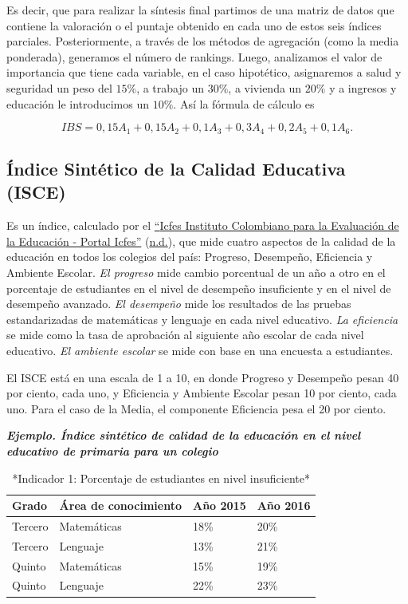 \documentclass[
  11pt,
]{book}
\begin{document}
Es decir, que para realizar la síntesis final partimos de una matriz de datos que contiene la valoración o el puntaje obtenido en cada uno de estos seis índices parciales. Posteriormente, a través de los métodos de agregación (como la media ponderada), generamos el número de rankings. Luego, analizamos el valor de importancia que tiene cada variable, en el caso hipotético, asignaremos a salud y seguridad un peso del \(15\%\), a trabajo un \(30\%\), a vivienda un \(20\%\) y a ingresos y educación le introducimos un \(10\%\). Así la fórmula de cálculo es

\[\begin{equation}
IBS=0,15A_1+0,15A_2+0,1A_3+0,3A_4+0,2A_5+0,1A_6.
\end{equation}\]

\hypertarget{uxedndice-sintuxe9tico-de-la-calidad-educativa-isce}{%
\subsection{Índice Sintético de la Calidad Educativa (ISCE)}\label{uxedndice-sintuxe9tico-de-la-calidad-educativa-isce}}

Es un índice, calculado por el \protect\hyperlink{ref-BibEntry2021Mayo}{{``{Icfes Instituto Colombiano para la Evaluaci{ó}n de la Educaci{ó}}n - Portal Icfes''}} (\protect\hyperlink{ref-BibEntry2021Mayo}{n.d.}), que mide cuatro
aspectos de la calidad de la educación en todos los colegios
del país: Progreso, Desempeño, Eficiencia y Ambiente Escolar. \emph{El progreso} mide cambio porcentual de un año a otro en el porcentaje de estudiantes en el nivel de desempeño insuficiente y en el nivel de desempeño avanzado. \emph{El desempeño} mide los resultados de las pruebas estandarizadas de matemáticas y lenguaje en cada nivel educativo. \emph{La eficiencia} se mide como la tasa
de aprobación al siguiente año escolar de cada nivel educativo. \emph{El ambiente escolar} se mide con base en una encuesta a estudiantes.

El ISCE está en una escala de 1 a 10, en donde Progreso y Desempeño pesan 40 por ciento, cada uno, y Eficiencia y Ambiente Escolar pesan 10 por ciento, cada uno. Para el caso de la Media, el componente Eficiencia pesa el 20 por ciento.

\textbf{\emph{Ejemplo. Índice sintético de calidad de la educación en el nivel educativo de primaria para un colegio}}

\begin{table}

\caption{\label{tab:unnamed-chunk-16}*Indicador 1: Porcentaje de estudiantes en nivel insuficiente*}
\centering
\begin{tabular}[t]{l|l|l|l}
\hline
Grado & Área de conocimiento & Año 2015 & Año 2016\\
\hline
Tercero & Matemáticas & 18\% & 20\%\\
\hline
Tercero & Lenguaje & 13\% & 21\%\\
\hline
Quinto & Matemáticas & 15\% & 19\%\\
\hline
Quinto & Lenguaje & 22\% & 23\%\\
\hline
\end{tabular}
\end{table}
\end{document}
